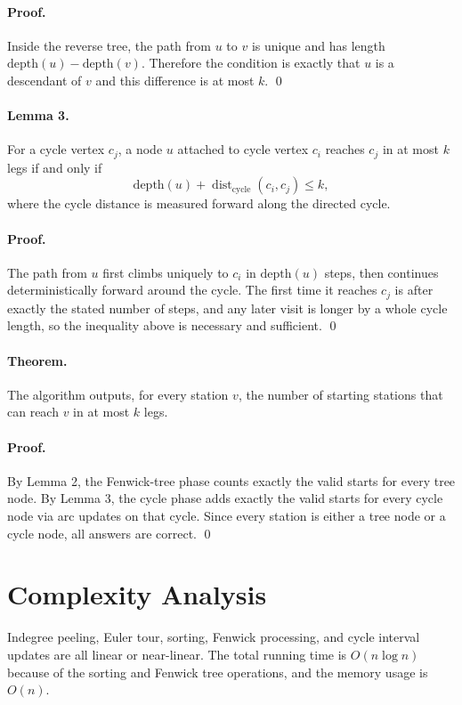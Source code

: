 \documentclass[11pt]{article}
\begin{document}
\paragraph{Proof.}
Inside the reverse tree, the path from $u$ to $v$ is unique and has length $\text{depth}(u)-\text{depth}(v)$. Therefore the condition is exactly that $u$ is a descendant of $v$ and this difference is at most $k$. \qed

\paragraph{Lemma 3.}
For a cycle vertex $c_j$, a node $u$ attached to cycle vertex $c_i$ reaches $c_j$ in at most $k$ legs if and only if
\[
\text{depth}(u) + \operatorname{dist}_{\text{cycle}}(c_i, c_j) \le k,
\]
where the cycle distance is measured forward along the directed cycle.

\paragraph{Proof.}
The path from $u$ first climbs uniquely to $c_i$ in $\text{depth}(u)$ steps, then continues deterministically forward around the cycle. The first time it reaches $c_j$ is after exactly the stated number of steps, and any later visit is longer by a whole cycle length, so the inequality above is necessary and sufficient. \qed

\paragraph{Theorem.}
The algorithm outputs, for every station $v$, the number of starting stations that can reach $v$ in at most $k$ legs.

\paragraph{Proof.}
By Lemma 2, the Fenwick-tree phase counts exactly the valid starts for every tree node. By Lemma 3, the cycle phase adds exactly the valid starts for every cycle node via arc updates on that cycle. Since every station is either a tree node or a cycle node, all answers are correct. \qed

\section*{Complexity Analysis}

Indegree peeling, Euler tour, sorting, Fenwick processing, and cycle interval updates are all linear or near-linear. The total running time is $O(n \log n)$ because of the sorting and Fenwick tree operations, and the memory usage is $O(n)$.
\end{document}
